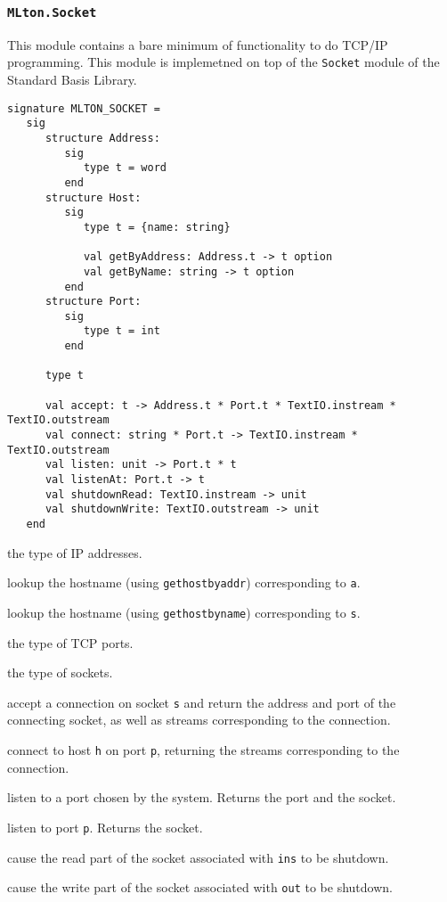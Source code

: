 \subsubsection{{\tt MLton.Socket}}
This module contains a bare minimum of functionality to do TCP/IP
programming.  This module is implemetned on top of the {\tt Socket}
module of the Standard Basis Library.
\begin{verbatim}
signature MLTON_SOCKET =
   sig
      structure Address:
         sig
            type t = word
         end
      structure Host:
         sig
            type t = {name: string}

            val getByAddress: Address.t -> t option
            val getByName: string -> t option
         end
      structure Port:
         sig
            type t = int
         end

      type t

      val accept: t -> Address.t * Port.t * TextIO.instream * TextIO.outstream
      val connect: string * Port.t -> TextIO.instream * TextIO.outstream
      val listen: unit -> Port.t * t
      val listenAt: Port.t -> t
      val shutdownRead: TextIO.instream -> unit
      val shutdownWrite: TextIO.outstream -> unit
   end
\end{verbatim}

\begin{description}

the type of IP addresses.

lookup the hostname (using {\tt gethostbyaddr}) corresponding to {\tt a}.

lookup the hostname (using {\tt gethostbyname}) corresponding to {\tt s}.

the type of TCP ports.

the type of sockets.

accept a connection on socket {\tt s} and return the address and
port of the connecting socket, as well as streams corresponding to the
connection.

connect to host {\tt h} on port {\tt p}, returning the streams
corresponding to the connection.

listen to a port chosen by the system.  Returns the port and the socket.

listen to port {\tt p}.  Returns the socket.

cause the read part of the socket associated with {\tt ins} to be shutdown.

cause the write part of the socket associated with {\tt out} to be shutdown.
\end{description}

